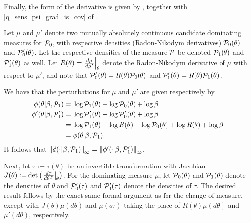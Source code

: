 Finally, the form of the derivative is given by \citet[Theorem
3.3.1]{krantz:2012:implicit}, together with \eqref{q_sens_psi_grad_is_cov} of
.
%

\vspace{1em}

%

Let $\mu$ and $\mu'$ denote two mutually absolutely continuous candidate
dominating measures for $\mathcal{P}_{0}$, with respective densities (Radon-Nikodym
derivatives) $\mathcal{P}_{0}(\theta)$ and $\mathcal{P}_{0}'(\theta)$.  Let the respective
densities of the measure $\mathcal{P}$ be denoted $\mathcal{P}_{1}(\theta)$ and $\mathcal{P}_{1}'(\theta)$ as
well.  Let $R(\theta) = \left.\frac{d\mu}{d\mu'}\right\vert_{\theta}$ denote the Radon-Nikodym
derivative of $\mu$ with respect to $\mu'$, and note that $\mathcal{P}_{0}'(\theta) =
R(\theta) \mathcal{P}_{0}(\theta)$ and $\mathcal{P}_{1}'(\theta) = R(\theta) \mathcal{P}_{1}(\theta)$.

We have that the perturbations for $\mu$ and $\mu'$ are given respectively by
%
\begin{align*}
%
\phi(\theta \vert \beta, \palt) ={}&
  \log \palt(\theta) - \log \pbase(\theta) + \log \beta \\
\phi'(\theta \vert \beta, \palt') ={}&
    \log \palt'(\theta) - \log \pbase'(\theta) + \log \beta
\\={}&
\log \palt(\theta) - \log R(\theta)
    - \log \pbase(\theta) + \log R(\theta)+ \log \beta
\\={}&
\phi(\theta \vert \beta, \palt).
%
\end{align*}
%
It follows that $\left\Vert\phi(\cdot \vert \beta, \mathcal{P}_{1})\right\Vert_{\infty} = \left\Vert\phi'(\cdot
\vert \beta, \mathcal{P}_{1}')\right\Vert_{\infty}$.

Next, let $\tau := \tau(\theta)$ be an invertible transformation with Jacobian
$J(\theta) := \mathrm{det}\left(\left.\frac{d\tau}{d\theta^T}\right\vert_{\theta}\right)$. For
the dominating measure $\mu$, let $\mathcal{P}_{0}(\theta)$ and $\mathcal{P}_{1}(\theta)$ denote
the densities of $\theta$ and $\mathcal{P}_{0}'(\tau)$ and $\mathcal{P}_{1}'(\tau)$ denote the
densities of $\tau$.  The desired result follows by the exact same formal
argument as for the change of measure, except with $J(\theta) \mu(d\theta)$
and $\mu(d\tau)$ taking the place of $R(\theta) \mu(d\theta)$ and
$\mu'(d\theta)$, respectively.
%

